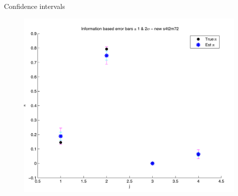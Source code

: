 \documentclass{beamer}
\begin{document}
\begin{frame}{Confidence intervals}
	
	\begin{figure}
			\begin{center}
				\includegraphics[scale=0.5]{errorgrid2.pdf}
			\end{center}
	\end{figure}
	
\end{frame}
\end{document}
